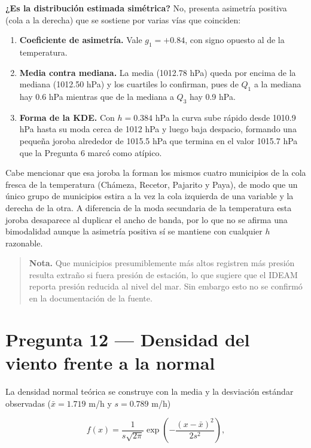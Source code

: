 \documentclass[oneside, openany, fontset=libertinus]{mitthesis}
\providecommand{\tightlist}{\setlength{\itemsep}{0pt}\setlength{\parskip}{0pt}}
\begin{document}
\textbf{¿Es la distribución estimada simétrica?} No, presenta asimetría
positiva (cola a la derecha) que se sostiene por varias vías que
coinciden:

\begin{enumerate}
\def\labelenumi{\alph{enumi}.}
\tightlist
\item
  \textbf{Coeficiente de asimetría.} Vale \(g_1 = +0.84\), con signo
  opuesto al de la temperatura.
\item
  \textbf{Media contra mediana.} La media (1012.78 hPa) queda por encima
  de la mediana (1012.50 hPa) y los cuartiles lo confirman, pues de
  \(Q_1\) a la mediana hay 0.6 hPa mientras que de la mediana a \(Q_3\)
  hay 0.9 hPa.
\item
  \textbf{Forma de la KDE.} Con \(h = 0.384\) hPa la curva sube rápido
  desde 1010.9 hPa hasta su moda cerca de 1012 hPa y luego baja
  despacio, formando una pequeña joroba alrededor de 1015.5 hPa que
  termina en el valor 1015.7 hPa que la Pregunta 6 marcó como atípico.
\end{enumerate}

Cabe mencionar que esa joroba la forman los mismos cuatro municipios de
la cola fresca de la temperatura (Chámeza, Recetor, Pajarito y Paya), de
modo que un único grupo de municipios estira a la vez la cola izquierda
de una variable y la derecha de la otra. A diferencia de la moda
secundaria de la temperatura esta joroba desaparece al duplicar el ancho
de banda, por lo que no se afirma una bimodalidad aunque la asimetría
positiva sí se mantiene con cualquier \(h\) razonable.

\begin{quote}
\textbf{Nota.} Que municipios presumiblemente más altos registren más
presión resulta extraño si fuera presión de estación, lo que sugiere que
el IDEAM reporta presión reducida al nivel del mar. Sin embargo esto no
se confirmó en la documentación de la fuente.
\end{quote}

\section{Pregunta 12 --- Densidad del viento frente a la
normal}\label{p12}

La densidad normal teórica se construye con la media y la desviación
estándar observadas (\(\bar{x} = 1.719\) m/h y \(s = 0.789\) m/h)

\[
f(x) = \frac{1}{s\sqrt{2\pi}} \exp\!\left( -\frac{(x - \bar{x})^2}{2 s^2} \right),
\]
\end{document}
